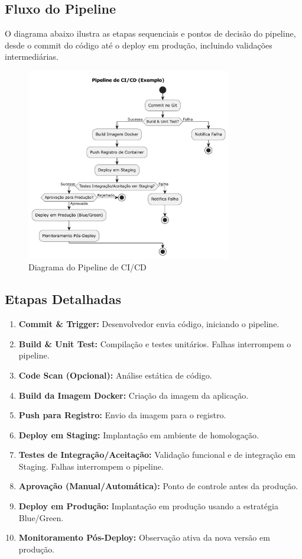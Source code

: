 \subsection{Fluxo do Pipeline}
\label{subsec:cicd-fluxo}
O diagrama abaixo ilustra as etapas sequenciais e pontos de decisão do pipeline, desde o commit do código até o deploy em produção, incluindo validações intermediárias.

\begin{figure}[htbp]
    \centering
    \includegraphics[width=0.8\textwidth]{../assets/diagrama-cicd.pdf}
    \caption{Diagrama do Pipeline de CI/CD}
    \label{fig:diagrama-cicd}
\end{figure}

\subsection{Etapas Detalhadas}
\label{subsec:cicd-etapas}
\begin{enumerate}
    \item \textbf{Commit \& Trigger:} Desenvolvedor envia código, iniciando o pipeline.
    \item \textbf{Build \& Unit Test:} Compilação e testes unitários. Falhas interrompem o pipeline.
    \item \textbf{Code Scan (Opcional):} Análise estática de código.
    \item \textbf{Build da Imagem Docker:} Criação da imagem da aplicação.
    \item \textbf{Push para Registro:} Envio da imagem para o registro.
    \item \textbf{Deploy em Staging:} Implantação em ambiente de homologação.
    \item \textbf{Testes de Integração/Aceitação:} Validação funcional e de integração em Staging. Falhas interrompem o pipeline.
    \item \textbf{Aprovação (Manual/Automática):} Ponto de controle antes da produção.
    \item \textbf{Deploy em Produção:} Implantação em produção usando a estratégia Blue/Green.
    \item \textbf{Monitoramento Pós-Deploy:} Observação ativa da nova versão em produção.
\end{enumerate}

